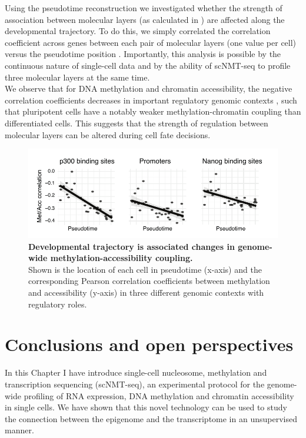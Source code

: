 Using the pseudotime reconstruction we investigated whether the strength of association between molecular layers (as calculated in ) are affected along the developmental trajectory. To do this, we simply correlated the correlation coefficient across genes between each pair of molecular layers (one value per cell) versus the pseudotime position . Importantly, this analysis is possible by the continuous nature of single-cell data and by the ability of scNMT-seq to profile three molecular layers at the same time.\\
We observe that for DNA methylation and chromatin accessibility, the negative correlation coefficients decreases in important regulatory genomic contexts , such that pluripotent cells have a notably weaker methylation-chromatin coupling than differentiated cells. This suggests that the strength of regulation between molecular layers can be altered during cell fate decisions.

\begin{figure}[H]
	\centering
	\includegraphics[width=0.9\linewidth]{scNMT_pseudotime_coupling}
	\caption[]{\textbf{Developmental trajectory is associated changes in genome-wide methylation-accessibility coupling.}\\
	Shown is the location of each cell in pseudotime (x-axis) and the corresponding Pearson correlation coefficients between methylation and accessibility (y-axis) in three different genomic contexts with regulatory roles.
	}
	\label{fig:scnmt_pseudotime_coupling}
\end{figure}

\section{Conclusions and open perspectives}

In this Chapter I have introduce single-cell nucleosome, methylation and transcription sequencing (scNMT-seq), an experimental protocol for the genome-wide profiling of RNA expression, DNA methylation and chromatin accessibility in single cells. We have shown that this novel technology can be used to study the connection between the epigenome and the transcriptome in an unsupervised manner.

